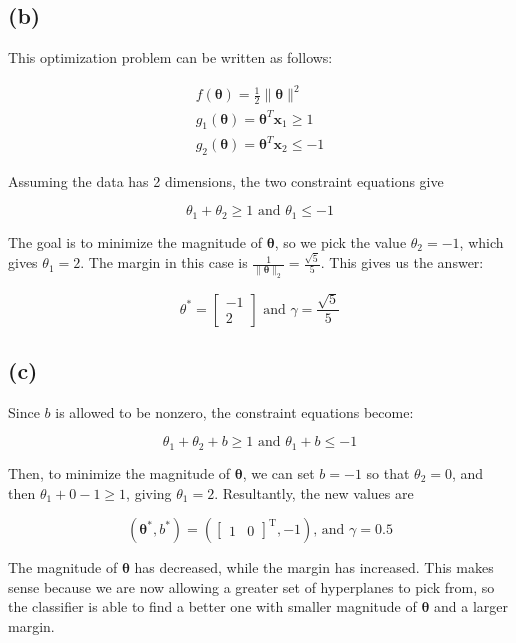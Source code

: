 \documentclass[11pt]{article}
\newcommand{\sol}[1]{{\bf{\color{magenta}{{Solution:}}}}}
\begin{document}
\subsection{(b)}
\sol x This optimization problem can be written as follows:

$$
\begin{gathered}
f(\boldsymbol{\theta})=\frac{1}{2}\|\boldsymbol{\theta}\|^{2} \\
g_{1}(\boldsymbol{\theta})=\boldsymbol{\theta}^{T} \mathbf{x}_{1} \geq 1 \\
g_{2}(\boldsymbol{\theta})=\boldsymbol{\theta}^{T} \mathbf{x}_{2} \leq-1
\end{gathered}
$$

Assuming the data has 2 dimensions, the two constraint equations give

$$
\theta_{1}+\theta_{2} \geq 1 \text { and } \theta_{1} \leq-1
$$

The goal is to minimize the magnitude of $\boldsymbol{\theta}$, so we pick the value $\theta_{2}=-1$, which gives $\theta_{1}=2$. The margin in this case is $\frac{1}{\|\boldsymbol{\theta}\|_{2}}=\frac{\sqrt{5}}{5}$. This gives us the answer:

$$
\theta^{*}=\left[\begin{array}{c}
-1 \\
2
\end{array}\right] \text { and } \gamma=\frac{\sqrt{5}}{5}
$$

\subsection{(c)}
\sol x Since $b$ is allowed to be nonzero, the constraint equations become:

$$
\theta_{1}+\theta_{2}+b \geq 1 \text { and } \theta_{1}+b \leq-1
$$

Then, to minimize the magnitude of $\boldsymbol{\theta}$, we can set $b=-1$ so that $\theta_{2}=0$, and then $\theta_{1}+0-1 \geq 1$, giving $\theta_{1}=2$. Resultantly, the new values are

$$
\left(\boldsymbol{\theta}^{*}, b^{*}\right)=\left(\left[\begin{array}{ll}
1 & 0
\end{array}\right]^{\mathrm{T}},-1\right) \text {, and } \gamma=0.5
$$

The magnitude of $\boldsymbol{\theta}$ has decreased, while the margin has increased. This makes sense because we are now allowing a greater set of hyperplanes to pick from, so the classifier is able to find a better one with smaller magnitude of $\boldsymbol{\theta}$ and a larger margin. 
\end{document}
